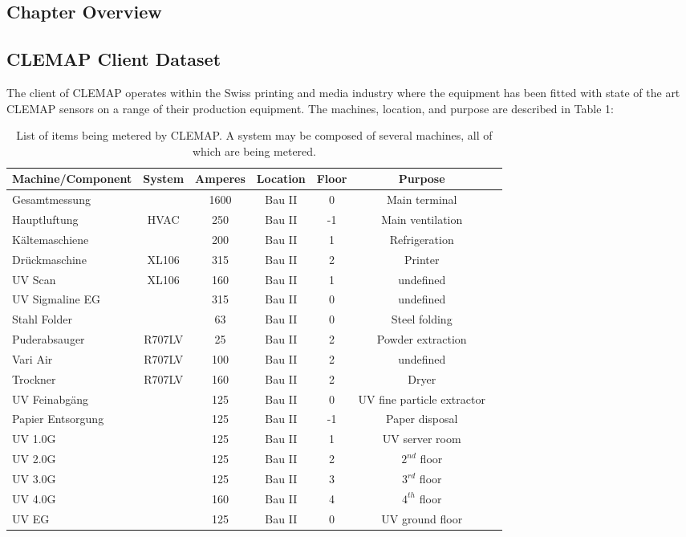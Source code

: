 \subsection{Chapter Overview}

\subsection{CLEMAP Client Dataset}

The client of CLEMAP operates within the Swiss printing and media industry where the equipment has been fitted with state of the art CLEMAP sensors on a range of their production equipment. The machines, location, and purpose are described in Table 1:

\begin{table}[htbp]
    \renewcommand{\arraystretch}{1.2}
    \centering
    \begin{tabular}{lcccccc}
    \hline
         Machine/Component & System & Amperes & Location & Floor & Purpose  \\
    \hline
    Gesamtmessung & & 1600 & Bau II & 0 & Main terminal \\
    Hauptluftung & HVAC & 250 & Bau II & -1 & Main ventilation \\
    Kältemaschiene & & 200 & Bau II & 1 & Refrigeration \\
    Drückmaschine & XL106 & 315 & Bau II & 2 & Printer \\
    UV Scan & XL106 & 160 & Bau II & 1 & undefined \\
    UV Sigmaline EG & & 315 & Bau II & 0 & undefined \\
    Stahl Folder & & 63 & Bau II & 0 & Steel folding \\
    Puderabsauger & R707LV & 25 & Bau II & 2 & Powder extraction \\
    Vari Air & R707LV & 100 & Bau II & 2 & undefined \\
    Trockner & R707LV & 160 & Bau II & 2 & Dryer \\
    UV Feinabgäng & & 125 & Bau II & 0 & UV fine particle extractor \\
    Papier Entsorgung & & 125 & Bau II & -1 & Paper disposal \\
    UV 1.0G & & 125 & Bau II & 1 & UV server room \\
    UV 2.0G & & 125 & Bau II & 2 & $2^{nd}$ floor \\
    UV 3.0G & & 125 & Bau II & 3 & $3^{rd}$ floor \\
    UV 4.0G & & 160 & Bau II & 4 & $4^{th}$ floor \\
    UV EG & & 125 & Bau II & 0 & UV ground floor \\
    \hline
    \end{tabular}
    \caption{List of items being metered by CLEMAP. A system may be composed of several machines, all of which are being metered.}
    \label{tab:my_label}
\end{table}

